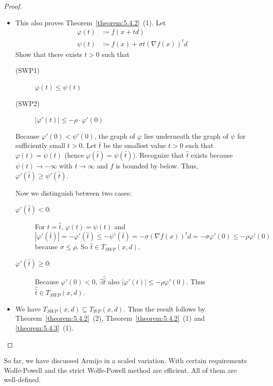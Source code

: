 \documentclass[a4paper]{article}
\numberwithin{lecref}{subsection}
\newcommand{\Abs}[1]{\left|#1\right|}
\begin{document}
\begin{proof}
	\begin{itemize}
		\item This also proves Theorem~\ref{theorem:5.4.2}~(1). Let
			\begin{align*}
				\varphi(t) &\coloneqq f(x + td) \\
				\psi(t) &\coloneqq f(x) + \sigma t\left(\nabla f(x)\right)^t d
			\end{align*}
			Show that there exists $t > 0$ such that
			\begin{description}
				\item[(SWP1)] $\varphi(t) \leq \psi(t)$
				\item[(SWP2)] $\Abs{\varphi'(t)} \leq -\rho \cdot \varphi'(0)$
			\end{description}

			Because $\varphi'(0) < \psi'(0)$, the graph of $\varphi$ lies underneath the graph of $\psi$ for sufficiently small $t > 0$. Let $\hat t$ be the smallest value $t > 0$ such that $\varphi(t) = \psi(t)$ (hence $\varphi(\hat t) = \psi(\hat t)$).
			Recognize that $\hat t$ exists because $\psi(t) \to -\infty$ with $t \to \infty$ and $f$ is bounded by below.
			Thus, $\varphi'(\hat t) \geq \psi'(\hat t)$.

			Now we distinguish between two cases:
			\begin{description}
				\item[$\varphi'(\hat t) < 0$:]
					For $t = \hat t$, $\varphi(t) = \psi(t)$ and
					\[ \Abs{\varphi'(\hat t)} = -\varphi'(\hat t) \leq -\psi'(\hat t) = -\sigma(\nabla f(x))^t d = -\sigma \varphi'(0) \leq -\rho \varphi'(0) \]
					because $\sigma \leq \rho$. So $\hat t \in T_{SWP}(x, d)$.
				\item[$\varphi'(\hat t) \geq 0$:]
					Because $\varphi'(0) < 0$, $\exists \hat{\hat t}$ also $\Abs{\varphi'(t)} \leq -\rho \varphi'(0)$.
					Thus $\hat{\hat t} \in T_{SWP}(x, d)$.
			\end{description}
		\item We have $T_{SWP}(x, d) \subseteq T_{WP}(x, d)$.
			Thus the result follows by Theorem~\ref{theorem:5.4.2}~(2), Theorem~\ref{theorem:5.4.2}~(1) and \ref{theorem:5.4.3}~(1).
	\end{itemize}
\end{proof}

So far, we have discussed Armijo in a scaled variation.
With certain requirements Wolfe-Powell and the strict Wolfe-Powell method are efficient.
All of them are well-defined.
\end{document}
